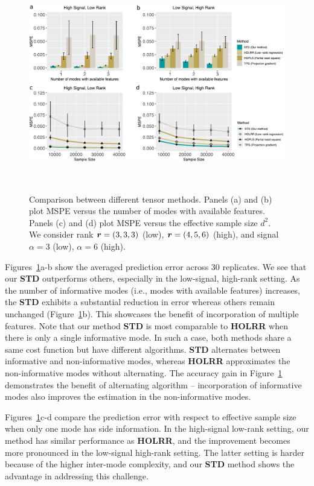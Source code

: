 \documentclass[12pt]{article}
\theoremstyle{definition}
\theoremstyle{definition}
\begin{document}
\begin{figure}[ht]
\centering
\includegraphics[width=15cm]{compare_alternative.pdf} 
\caption{Comparison between different tensor methods. Panels (a) and (b) plot MSPE versus the number of modes with available features. Panels (c) and (d) plot MSPE versus the effective sample size $d^2$.
We consider rank $\bm{r}=(3,3,3)$ (low), $\bm{r}=(4,5,6)$ (high), and signal $\alpha =3 $ (low), $\alpha=6$ (high).}~\label{fig:compare}
\end{figure}

Figures~\ref{fig:compare}a-b show the averaged prediction error across 30 replicates. We see that our {\bf STD} outperforms others, especially in the low-signal, high-rank setting. As the number of informative modes (i.e., modes with available features) increases, the {\bf STD} exhibits a substantial reduction in error whereas others remain unchanged (Figure~\ref{fig:compare}b). This showcases the benefit of incorporation of multiple features. Note that our method {\bf STD} is most comparable to {\bf HOLRR} when there is only a single informative mode. In such a case, both methods share a same cost function but have different algorithms. {\bf STD} alternates between informative and non-informative modes, whereas {\bf HOLRR} approximates the non-informative modes without alternating. The accuracy gain in Figure~\ref{fig:compare} demonstrates the benefit of alternating algorithm -- incorporation of informative modes also improves the estimation in the non-informative modes. 


Figures~\ref{fig:compare}c-d compare the prediction error with respect to effective sample size when only one mode has side information. In the high-signal low-rank setting, our method has similar performance as {\bf HOLRR}, and the improvement becomes more pronounced in the low-signal high-rank setting. The latter setting is harder because of the higher inter-mode complexity, and our {\bf STD} method shows the advantage in addressing this challenge. 
\end{document}
